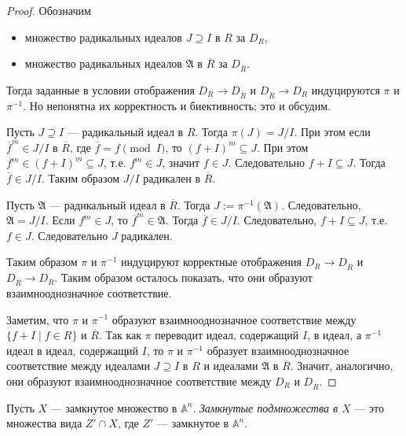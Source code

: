 \documentclass[12pt,a4paper]{article}
\renewcommand{\AA}{\ensuremath{\mathbb{A}}\xspace}
\begin{document}
    \begin{proof}
        Обозначим
        \begin{itemize}
            \item множество радикальных идеалов $J \supseteq I$ в $R$ за $D_R$,
            \item множество радикальных идеалов $\mathfrak{A}$ в $\overline{R}$ за $D_{\overline{R}}$.
        \end{itemize}
        Тогда заданные в условии отображения $D_R \to D_{\overline{R}}$ и $D_{\overline{R}} \to D_R$ индуцируются $\pi$ и $\pi^{-1}$. Но непонятна их корректность и биективность; это и обсудим.

        Пусть $J \supseteq I$ --- радикальный идеал в $R$. Тогда $\pi(J) = J/I$. При этом если $\overline{f}^m \in J/I$ в $\overline{R}$, где $\overline{f} = f \pmod{I}$, то $(f+I)^m \subseteq J$. При этом $f^m \in (f+I)^m \subseteq J$, т.е. $f^m \in J$, значит $f \in J$. Следовательно $f + I \subseteq J$. Тогда $\overline{f} \in J/I$. Таким образом $J/I$ радикален в $\overline{R}$.

        Пусть $\mathfrak{A}$ --- радикальный идеал в $\overline{R}$. Тогда $J := \pi^{-1}(\mathfrak{A})$. Следовательно, $\mathfrak{A} = J/I$. Если $f^m \in J$, то $\overline{f}^m \in \mathfrak{A}$. Тогда $\overline{f} \in J/I$. Следовательно, $f + I \subseteq J$, т.е. $f \in J$. Следовательно $J$ радикален.

        Таким образом $\pi$ и $\pi^{-1}$ индуцируют корректные отображения $D_R \to D_{\overline{R}}$ и $D_{\overline{R}} \to D_R$. Таким образом осталось показать, что они образуют взаимнооднозначное соответствие.

        Заметим, что $\pi$ и $\pi^{-1}$ образуют взаимнооднозначное соответствие между $\{f + I \mid f \in R\}$ и $\overline{R}$. Так как $\pi$ переводит идеал, содержащий $I$, в идеал, а $\pi^{-1}$ идеал в идеал, содержащий $I$, то $\pi$ и $\pi^{-1}$ образует взаимнооднозначное соответствие между идеалами $J \supseteq I$ в $R$ и идеалами $\mathfrak{A}$ в $\overline{R}$. Значит, аналогично, они образуют взаимнооднозначное соответствие между $D_R$ и $D_{\overline{R}}$.
    \end{proof}

    \begin{definition}
        Пусть $X$ --- замкнутое множество в $\AA^n$. \emph{Замкнутые подмножества в $X$} --- это множества вида $Z' \cap X$, где $Z'$ --- замкнутое в $\AA^n$. 
    \end{definition}
\end{document}

